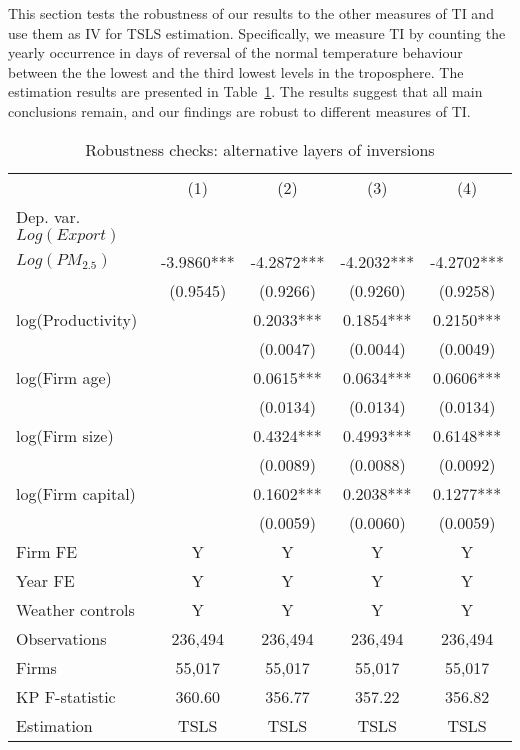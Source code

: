 \documentclass[12pt]{article}
\begin{document}
    This section tests the robustness of our results to the other measures of TI and use them as IV for TSLS estimation. Specifically, we measure TI by counting the yearly occurrence in days of reversal of the normal temperature behaviour between the the lowest and the third lowest levels in the troposphere. The estimation results are presented in Table~\ref{tab:TI_alt}. The results suggest that all main conclusions remain, and our findings are robust to different measures of TI. 
    
    \begin{table}[H]\centering
      \caption{Robustness checks: alternative layers of inversions}\label{tab:TI_alt}
      \begin{tabular}{l*{4}{c}}
        \hline\hline
        &\multicolumn{1}{c}{(1)}&\multicolumn{1}{c}{(2)}&\multicolumn{1}{c}{(3)}&\multicolumn{1}{c}{(4)}\\
        Dep. var. $Log(Export)$  &&&&\\ 
        \hline
        $Log(PM_{2.5})$     &-3.9860***&-4.2872***&-4.2032***&-4.2702***\\
                            &(0.9545)&(0.9266)&(0.9260)&(0.9258)\\
        log(Productivity) &&0.2033***&0.1854***&0.2150***\\
                                  &&(0.0047)&(0.0044)&(0.0049)\\
        log(Firm age)  &&0.0615***&0.0634***&0.0606***\\
                      &&(0.0134)&(0.0134)&(0.0134)\\
        log(Firm size) &&0.4324***&0.4993***&0.6148***\\
                      &&(0.0089)&(0.0088)&(0.0092)\\
        log(Firm capital) &&0.1602***&0.2038***&0.1277***\\
                          &&(0.0059)&(0.0060)&(0.0059)\\
        \hline
        Firm FE &Y&Y&Y&Y\\
        Year FE &Y&Y&Y&Y\\
        Weather controls &Y&Y&Y&Y\\
        \hline
        Observations   &236,494&236,494&236,494&236,494\\
        Firms          &55,017 &55,017 &55,017&55,017\\
        KP F-statistic &360.60&356.77&357.22&356.82\\
        Estimation &TSLS&TSLS&TSLS&TSLS\\
        \hline\hline
      \end{tabular}


\end{table}
\end{document}
